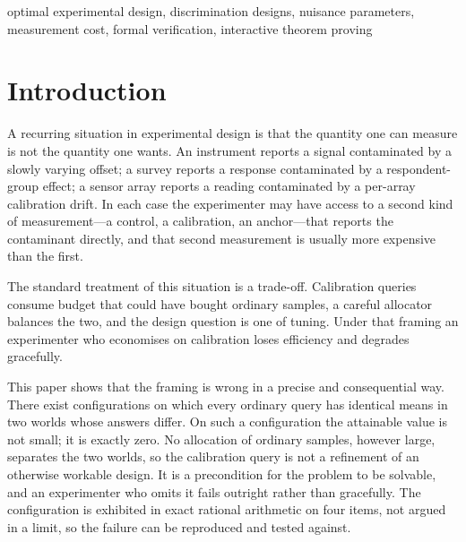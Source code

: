 \begin{IEEEkeywords}
optimal experimental design, discrimination designs, nuisance parameters, measurement cost,
formal verification, interactive theorem proving
\end{IEEEkeywords}

\section{Introduction}

A recurring situation in experimental design is that the quantity one can measure is not the
quantity one wants. An instrument reports a signal contaminated by a slowly varying offset;
a survey reports a response contaminated by a respondent-group effect; a sensor array
reports a reading contaminated by a per-array calibration drift. In each case the
experimenter may have access to a second kind of measurement---a control, a calibration, an
anchor---that reports the contaminant directly, and that second measurement is usually more
expensive than the first.

The standard treatment of this situation is a trade-off. Calibration queries consume budget
that could have bought ordinary samples, a careful allocator balances the two, and the
design question is one of tuning. Under that framing an experimenter who economises on
calibration loses efficiency and degrades gracefully.

This paper shows that the framing is wrong in a precise and consequential way. There exist
configurations on which every ordinary query has identical means in two worlds whose
answers differ. On such a configuration the attainable value is not small; it is exactly
zero. No allocation of ordinary samples, however large, separates the two worlds, so the
calibration query is not a refinement of an otherwise workable design. It is a precondition
for the problem to be solvable, and an experimenter who omits it fails outright rather than
gracefully. The configuration is exhibited in exact rational arithmetic on four items, not
argued in a limit, so the failure can be reproduced and tested against.

